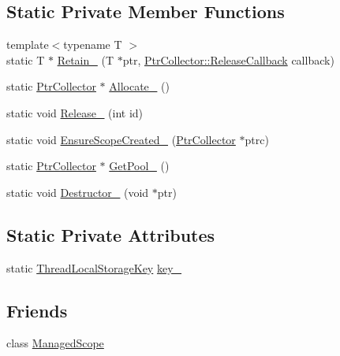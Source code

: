 \subsection*{Static Private Member Functions}
\begin{DoxyCompactItemize}
\item 
{\footnotesize template$<$typename T $>$ }\\static T $\ast$ \hyperlink{classmocha_1_1_managed_handle_a29dcd71720891229c0069583cb67abba}{Retain\_\-} (T $\ast$ptr, \hyperlink{classmocha_1_1_ptr_collector_a5ec1946ab80fe57d29680f29ef30abb1}{PtrCollector::ReleaseCallback} callback)
\item 
static \hyperlink{classmocha_1_1_ptr_collector}{PtrCollector} $\ast$ \hyperlink{classmocha_1_1_managed_handle_af9863134e40e2bb21165df5a4886c768}{Allocate\_\-} ()
\item 
static void \hyperlink{classmocha_1_1_managed_handle_a134e1b71ba18748aaf347632b0a546dc}{Release\_\-} (int id)
\item 
static void \hyperlink{classmocha_1_1_managed_handle_a96aff39e005fd1125fe4164e310fcb95}{EnsureScopeCreated\_\-} (\hyperlink{classmocha_1_1_ptr_collector}{PtrCollector} $\ast$ptrc)
\item 
static \hyperlink{classmocha_1_1_ptr_collector}{PtrCollector} $\ast$ \hyperlink{classmocha_1_1_managed_handle_abd3b8e22f65399e92220fd9701404425}{GetPool\_\-} ()
\item 
static void \hyperlink{classmocha_1_1_managed_handle_aa5dc7f633fe0ab07ace269c1f0c2d2cd}{Destructor\_\-} (void $\ast$ptr)
\end{DoxyCompactItemize}
\subsection*{Static Private Attributes}
\begin{DoxyCompactItemize}
\item 
static \hyperlink{classmocha_1_1_thread_local_storage_key}{ThreadLocalStorageKey} \hyperlink{classmocha_1_1_managed_handle_a026ef7f5d722421dfd597fd18df39661}{key\_\-}
\end{DoxyCompactItemize}
\subsection*{Friends}
\begin{DoxyCompactItemize}
\item 
class \hyperlink{classmocha_1_1_managed_handle_a918558197438d96930f72064778d0828}{ManagedScope}
\end{DoxyCompactItemize}


